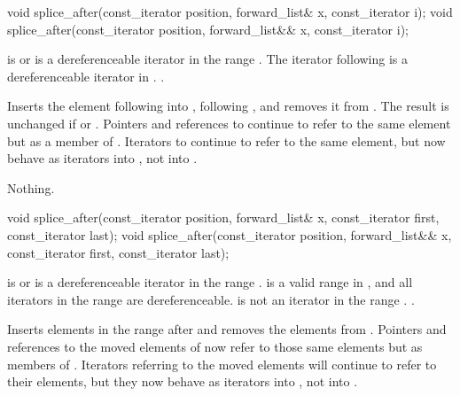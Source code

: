 %
\begin{itemdecl}
void splice_after(const_iterator position, forward_list& x, const_iterator i);
void splice_after(const_iterator position, forward_list&& x, const_iterator i);
\end{itemdecl}

\begin{itemdescr}
\pnum
\requires {} is  or is a dereferenceable
iterator in the range .
The iterator following  is a dereferenceable iterator in .
.

\pnum
\effects Inserts the element following  into , following
, and removes it from .
The result is unchanged if  or . Pointers
and references to  continue to refer to the same element but as a member of
. Iterators to  continue to refer to
the same element, but now behave as iterators into , not into .

\pnum
\throws Nothing.

\pnum
\complexity {}
\end{itemdescr}

%
\begin{itemdecl}
void splice_after(const_iterator position, forward_list& x,
                  const_iterator first, const_iterator last);
void splice_after(const_iterator position, forward_list&& x,
                  const_iterator first, const_iterator last);
\end{itemdecl}

\begin{itemdescr}
\pnum
\requires {} is  or is a
dereferenceable iterator in the range .  is a
valid range in , and all iterators in the range  are
dereferenceable.  is not an iterator in the range .
.

\pnum
\effects Inserts elements in the range  after  and
removes the elements from . Pointers and references to the moved elements of
 now refer to those same elements but as members of . Iterators
referring to the moved elements will continue to refer to their elements, but they now
behave as iterators into , not into .

\pnum
\complexity {}
\end{itemdescr}

